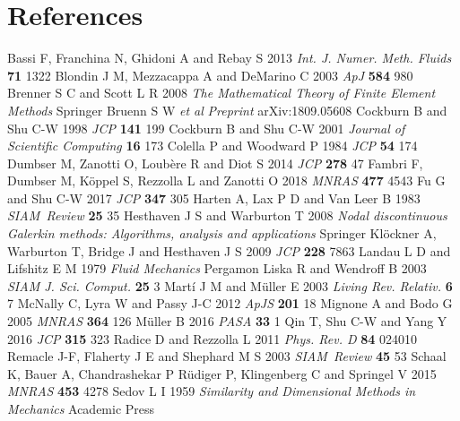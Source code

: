 \documentclass[letterpaper]{jpconf}
\begin{document}
\section*{References}
\begin{thebibliography}{36}
   Bassi F, Franchina N, Ghidoni A and Rebay S 2013 {\it Int. J. Numer. Meth. Fluids} {\bf 71} 1322
   Blondin J M, Mezzacappa A and DeMarino C 2003 {\it ApJ} {\bf 584} 980
   Brenner S C and Scott L R 2008 {\it The Mathematical Theory of Finite Element Methods} Springer
   Bruenn S W {\it et al} {\it Preprint} arXiv:1809.05608
   Cockburn B and Shu C-W 1998 {\it JCP} {\bf 141} 199
   Cockburn B and Shu C-W 2001 {\it Journal of Scientific Computing} {\bf 16} 173
   Colella P and Woodward P 1984 {\it JCP} {\bf 54} 174
   Dumbser M, Zanotti O, Loub{\`e}re R and Diot S 2014 {\it JCP} {\bf 278} 47
   Fambri F, Dumbser M, K{\"o}ppel S, Rezzolla L and Zanotti O 2018 {\it MNRAS} {\bf 477} 4543
   Fu G and Shu C-W 2017 {\it JCP} {\bf 347} 305
   Harten A, Lax P D and Van Leer B 1983 {\it SIAM~Review} {\bf 25} 35
   Hesthaven J S and Warburton T 2008 {\it Nodal discontinuous Galerkin methods: Algorithms, analysis and applications} Springer
   Kl{\"o}ckner A, Warburton T, Bridge J and Hesthaven J S 2009 {\it JCP} {\bf 228} 7863
   Landau L D and Lifshitz E M 1979 {\it Fluid Mechanics} Pergamon
   Liska R and Wendroff B 2003 {\it SIAM J. Sci. Comput.} {\bf 25} 3
   Mart{\'i} J M and M{\"u}ller E 2003 {\it Living Rev. Relativ.} {\bf 6} 7
   McNally C, Lyra W and Passy J-C 2012 {\it ApJS} {\bf 201} 18
   Mignone A and Bodo G 2005 {\it MNRAS} {\bf 364} 126
   M{\"u}ller B 2016 {\it PASA} {\bf 33} 1
   Qin T, Shu C-W and Yang Y 2016 {\it JCP} {\bf 315} 323
   Radice D and Rezzolla L 2011 {\it Phys. Rev. D} {\bf 84} 024010
   Remacle J-F, Flaherty J E and Shephard M S 2003 {\it SIAM~Review} {\bf 45} 53
   Schaal K, Bauer A, Chandrashekar P R{\"u}diger P, Klingenberg C and Springel V 2015 {\it MNRAS} {\bf 453} 4278
   Sedov L I 1959 {\it Similarity and Dimensional Methods in Mechanics} Academic Press

\end{thebibliography}
\end{document}
